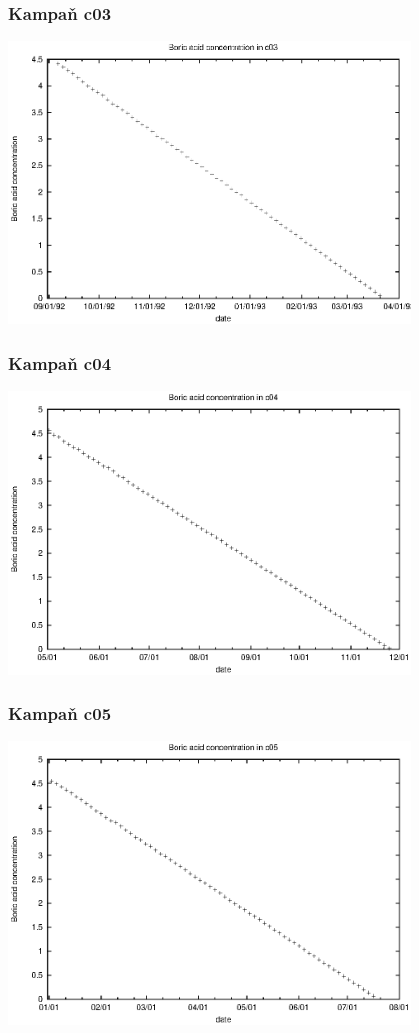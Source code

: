 \documentclass[a4paper,twoside,11pt]{article}
\begin{document}
\subsubsection{Kampaň c03}

\includegraphics[width=0.8\textwidth]{data_c03_bc.eps}


\subsubsection{Kampaň c04}

\includegraphics[width=0.8\textwidth]{data_c04_bc.eps}


\subsubsection{Kampaň c05}

\includegraphics[width=0.8\textwidth]{data_c05_bc.eps}
\end{document}
